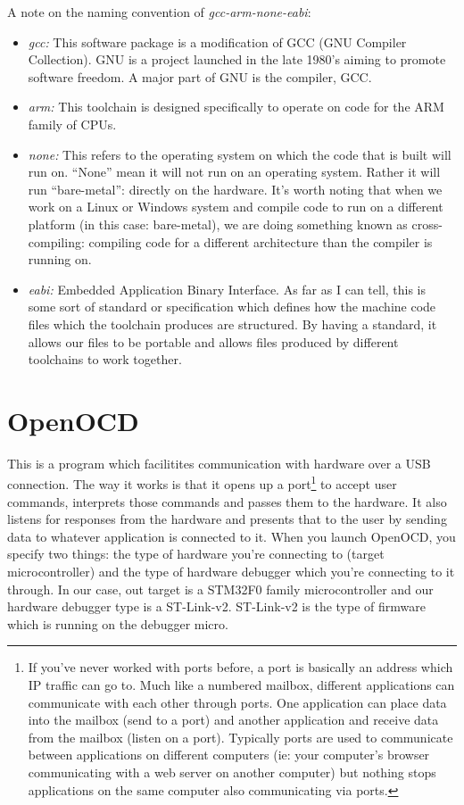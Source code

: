 A note on the naming convention of \emph{gcc-arm-none-eabi}:
\begin{itemize}
\item \emph{gcc:} This software package is a modification of GCC (GNU Compiler Collection). GNU is a project launched in the late 1980's aiming to promote software freedom. A major part of GNU is the compiler, GCC. 
\item \emph{arm:} This toolchain is designed specifically to operate on code for the ARM family of CPUs.
\item \emph{none:} This refers to the operating system on which the code that is built will run on. ``None'' mean it will not run on an operating system. Rather it will run ``bare-metal'': directly on the hardware. It's worth noting that when we work on a Linux or Windows system and compile code to run on a different platform (in this case: bare-metal), we are doing something known as cross-compiling: compiling code for a different architecture than the compiler is running on.
\item \emph{eabi:} Embedded Application Binary Interface. As far as I can tell, this is some sort of standard or specification which defines how the machine code files which the toolchain produces are structured. By having a standard, it allows our files to be portable and allows files produced by different toolchains to work together.
\end{itemize}

\section{OpenOCD}
This is a program which facilitites communication with hardware over a USB connection. The way it works is that it opens up a port\footnote{If you've never worked with ports before, a port is basically an address which IP traffic can go to. Much like a numbered mailbox, different applications can communicate with each other through ports. One application can place data into the mailbox (send to a port) and another application and receive data from the mailbox (listen on a port). Typically ports are used to communicate between applications on different computers (ie: your computer's browser communicating with a web server on another computer) but nothing stops applications on the same computer also communicating via ports.}
to accept user commands, interprets those commands and passes them to the hardware. It also listens for responses from the hardware and presents that to the user by sending data to whatever application is connected to it. When you launch OpenOCD, you specify two things: the type of hardware you're connecting to (target microcontroller) and the type of hardware debugger which you're connecting to it through. In our case, out target is a STM32F0 family microcontroller and our hardware debugger type is a ST-Link-v2. ST-Link-v2 is the type of firmware which is running on the debugger micro.

